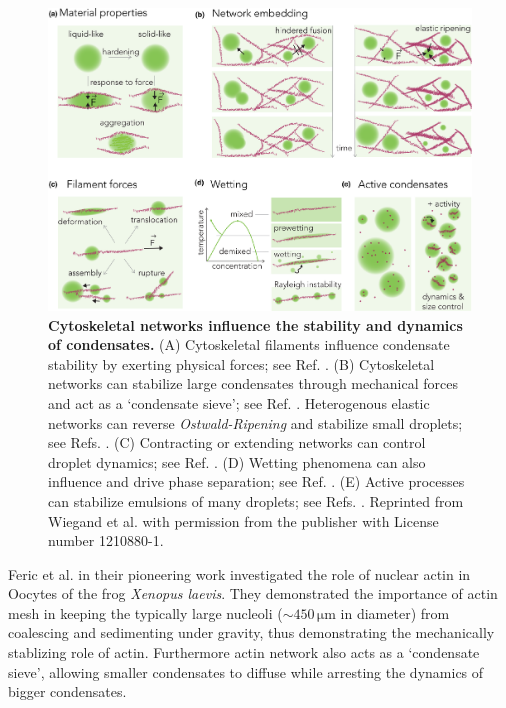 \begin{figure}[tb]
\centering
\includegraphics[scale=0.53]{MainContent/BioFigures/scaffolds.pdf}
\caption{\textbf{Cytoskeletal networks influence the stability and dynamics of condensates.}
(A) Cytoskeletal filaments influence condensate stability by exerting physical forces; see Ref. \cite{Enos2018}.
(B) Cytoskeletal networks can stabilize large condensates through mechanical forces and act as a `condensate sieve';  see Ref. \cite{Quiroz2020}.
Heterogenous elastic networks can reverse \textit{Ostwald-Ripening} and stabilize small droplets; see Refs. \cite{Rosowski2020,D0SM00628A}.
(C) Contracting or extending networks can control droplet dynamics; see Ref. \cite{Enos2018}.
(D) Wetting phenomena can also influence and drive phase separation; see Ref. \cite{Setru2021}.
(E) Active processes can stabilize emulsions of many droplets; see Refs. \cite{Zwicker2015,Review2019}.
Reprinted from Wiegand et al. \cite{Wiegand2020} with permission from the publisher with License number 1210880-1.
}
\label{fig:mechanical_forces_in_cells}
\end{figure}

Feric et al. \cite{Feric2013} in their pioneering work investigated the role of nuclear actin in Oocytes of the frog \textit{Xenopus laevis}.
They demonstrated the importance of actin mesh in keeping the typically large nucleoli ($\sim 450 \, \mathrm{\mu m}$ in diameter) from coalescing and sedimenting under gravity, thus demonstrating the mechanically stablizing role of actin.
Furthermore actin network also acts as a `condensate sieve', allowing smaller condensates to diffuse while arresting the dynamics of bigger condensates.

